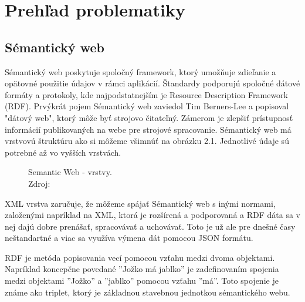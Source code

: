\documentclass[12pt, a4paper, oneside]{book}
\begin{document}
\part{Prehľad problematiky}
\chapter{Sémantický web}
Sémantický web \cite{semantic} poskytuje spoločný framework, ktorý umožňuje zdieľanie a opätovné použitie údajov v rámci aplikácií. Štandardy podporujú spoločné dátové formáty a protokoly, kde najpodstatnejším je Resource Description Framework (RDF). Prvýkrát pojem Sémantický web zaviedol Tim Berners-Lee a popisoval "dátový web", ktorý môže byť strojovo čitateľný. Zámerom je zlepšiť prístupnosť informácií publikovaných na webe pre strojové spracovanie. Sémantický web má vrstvovú štruktúru ako si môžeme všimnúť na obrázku 2.1. Jednotlivé údaje sú potrebné až vo vyšších vrstvách. 

\begin{figure}
\label{fig:semantic_web}
\caption{Semantic Web - vrstvy.\\Zdroj: \cite{semanticweb}}

\end{figure}

XML vrstva zaručuje, že môžeme spájať Sémantický web s inými normami, založenými napríklad na XML, ktorá je rozšírená a podporovaná a RDF dáta sa v nej dajú dobre prenášať, spracovávať a uchovávať. Toto je už ale pre dnešné časy neštandartné a viac sa využíva výmena dát pomocou JSON formátu. 


RDF je metóda popisovania vecí pomocou vzťahu medzi dvoma objektami. Napríklad koncepčne povedané ''Jožko má jablko'' je zadefinovaním spojenia medzi objektami ''Jožko'' a ''jablko'' pomocou vzťahu ''má''.
Toto spojenie je známe ako triplet, ktorý je základnou stavebnou jednotkou sémantického webu. 
\end{document}
